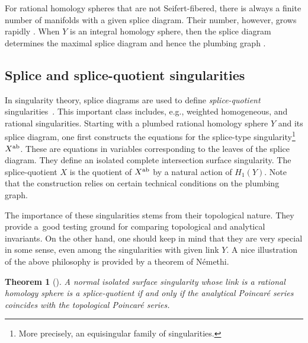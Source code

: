 \documentclass[pdftex]{sigma}
\newtheorem{Theorem}{Theorem}[section]
\begin{document}
\begin{Remark}
	For rational homology spheres that are not Seifert-fibered, there is always a finite number of manifolds with a given splice diagram. Their number, however, grows rapidly \cite[Proposition~4.3]{Neu07}. When $Y$ is an integral homology sphere, then the splice diagram determines the maximal splice diagram and hence the plumbing graph \cite{EN86}.
\end{Remark}

\subsection{Splice and splice-quotient singularities}\label{ssec:splice_quotient}

In singularity theory, splice diagrams are used to define \emph{splice-quotient} singularities~\cite{NW05a}. This important class includes, e.g., weighted homogeneous, and rational singularities. Starting with a plumbed rational homology sphere $Y$ and its splice diagram, one first constructs the equations for the splice-type singularity\footnote{More precisely, an equisingular family of singularities.} $X^{\rm ab}$. These are equations in variables corresponding to the leaves of the splice diagram. They define an isolated complete intersection surface singularity. The splice-quotient $X$ is the quotient of $X^{\rm ab}$ by a natural action of $H_1(Y)$. Note that the construction relies on certain technical conditions on the plumbing graph.

The importance of these singularities stems from their topological nature. They provide a~good testing ground for comparing topological and analytical invariants. On the other hand, one should keep in mind that they are very special in some sense, even among the singularities with given link $Y$. A nice illustration of the above philosophy is provided by a theorem of N\'emethi.

\begin{Theorem}[{\cite[8.5.19--8.5.26]{Nem22}}]
	 A normal isolated surface singularity whose link is a rational homology sphere is a splice-quotient if and only if the analytical Poincar\'e series coincides with the topological Poincar\'e series.
\end{Theorem}
\end{document}
